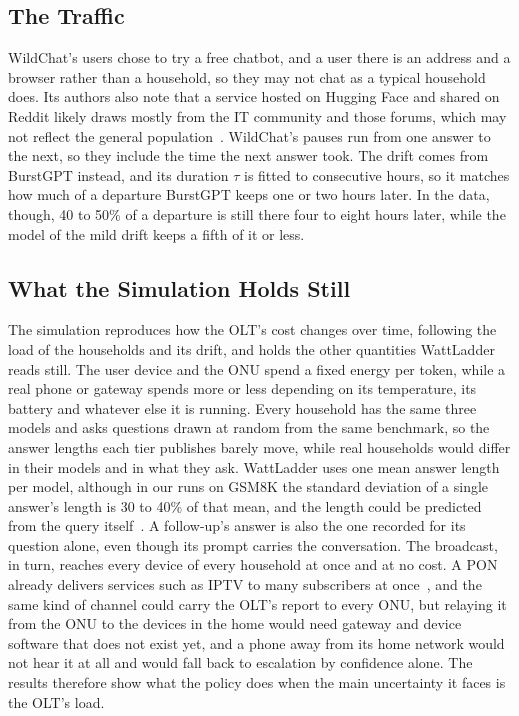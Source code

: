 \documentclass[cic,dipl,english]{infufrgs}
\begin{document}
\subsection{The Traffic}

WildChat's users chose to try a free chatbot, and a user there is an address and a browser
rather than a household, so they may not chat as a typical household does. Its authors also
note that a service hosted on Hugging Face and shared on Reddit likely draws mostly from the IT
community and those forums, which may not reflect the general population~\cite{zhao2024wildchat}.
WildChat's pauses run from one answer to the next, so they include the time the next answer
took. The drift comes from BurstGPT instead, and its duration $\tau$ is fitted to consecutive
hours, so it matches how much of a departure BurstGPT keeps one or two hours later. In the
data, though, 40 to 50\% of a departure is still there four to eight hours later, while the
model of the mild drift keeps a fifth of it or less.

\subsection{What the Simulation Holds Still}

The simulation reproduces how the OLT's cost changes over time, following the load of the
households and its drift, and holds the other quantities WattLadder reads still. The user
device and the ONU spend a fixed energy per token, while a real phone or gateway spends more
or less depending on its temperature, its battery and whatever else it is running. Every
household has the same three models and asks questions drawn at random from the same
benchmark, so the answer lengths each tier publishes barely move, while real households
would differ in their models and in what they ask. WattLadder uses one mean answer length per
model, although in our runs on GSM8K the standard deviation of a single answer's length is 30
to 40\% of that mean, and the length could be predicted from the query itself~\cite{zheng2023response}.
A follow-up's answer is also the one recorded for its question alone, even though its prompt
carries the conversation. The broadcast, in turn, reaches every device of every household at
once and at no cost. A PON already delivers services such as IPTV to many subscribers at
once~\cite{effenberger2007introduction}, and the same kind of channel could carry the OLT's
report to every ONU, but relaying it from the ONU to the devices in the home would need gateway
and device software that does not exist yet, and a phone away from its home network would not
hear it at all and would fall back to escalation by confidence alone. The results therefore show
what the policy does when the main uncertainty it faces is the OLT's load.
\end{document}
